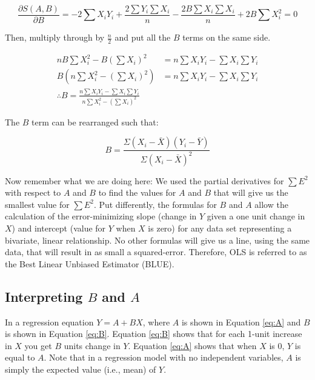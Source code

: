 \documentclass[11pt,openany]{book}\usepackage[]{graphicx}\usepackage[]{color}
\begin{document}
\begin{equation*}
\frac{\partial S(A,B)}{\partial B} = -2 \sum X_{i}Y_{i}+\frac{2\sum Y_{i}
  \sum X_{i}}{n}-\frac{2B\sum X_{i} \sum X_{i}}{n}+ 2B
\sum X^{2}_{i} = 0
\end{equation*}

\noindent Then, multiply through by $\frac{n}{2}$ and put all the $B$ terms on the same side. 

\begin{align*}
nB \sum X^{2}_{i}-B(\sum X_{i})^{2} &= n \sum X_{i}Y_{i}-\sum X_{i}
\sum Y_{i} \\
B(n \sum X^{2}_{i}-(\sum X_{i})^{2}) &= n \sum X_{i}Y_{i}-\sum X_{i}
\sum Y_{i} \\
\therefore B = \frac{n \sum X_{i}Y_{i}-\sum X_{i}
\sum Y_{i}}{n\sum X^{2}_{i}-(\sum X_{i})^{2}}
\end{align*}

\noindent The $B$ term can be rearranged such that: 

\begin{equation}
\label{eq:B}  
B=\frac{\Sigma(X_{i}-\bar X)(Y_{i}-\bar Y)}{\Sigma(X_{i}-\bar X)^2}  
\end{equation}

Now remember what we are doing here: We used the partial derivatives for $\sum E^{2}$ with respect to $A$ and $B$ to find the values for $A$ and $B$ that will give us the smallest value for $\sum E^{2}$.  Put differently, the formulas for $B$ and $A$ allow the calculation of the error-minimizing slope (change in $Y$ given a one unit change in $X$) and intercept (value for $Y$ when $X$ is zero) for any data set representing a bivariate, linear relationship. No other formulas will give us a line, using the same data, that will result in as small a squared-error. Therefore, OLS is referred to as the Best Linear Unbiased Estimator (BLUE).  

\subsection{Interpreting $B$ and $A$}

In a regression equation $Y=A+BX$, where $A$ is shown in Equation \ref{eq:A} and $B$ is shown in Equation \ref{eq:B}. Equation \ref{eq:B} shows that for each 1-unit increase in $X$ you get $B$ units change in $Y$. Equation \ref{eq:A} shows that when $X$ is $0$, $Y$ is equal to $A$. Note that in a regression model with no independent variables, $A$ is simply the expected value (i.e., mean) of $Y$. 
\end{document}
